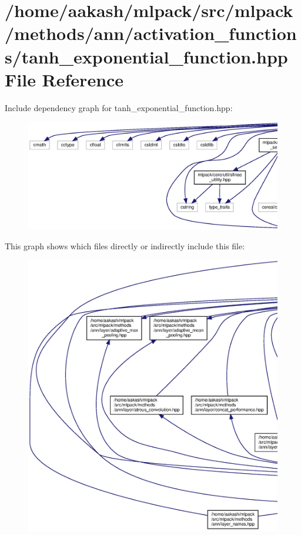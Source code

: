 \section{/home/aakash/mlpack/src/mlpack/methods/ann/activation\+\_\+functions/tanh\+\_\+exponential\+\_\+function.hpp File Reference}
\label{tanh__exponential__function_8hpp}
Include dependency graph for tanh\+\_\+exponential\+\_\+function.\+hpp\+:
\nopagebreak
\begin{figure}[H]
\begin{center}
\leavevmode
\includegraphics[width=350pt]{tanh__exponential__function_8hpp__incl}
\end{center}
\end{figure}
This graph shows which files directly or indirectly include this file\+:
\nopagebreak
\begin{figure}[H]
\begin{center}
\leavevmode
\includegraphics[width=350pt]{tanh__exponential__function_8hpp__dep__incl}
\end{center}
\end{figure}
